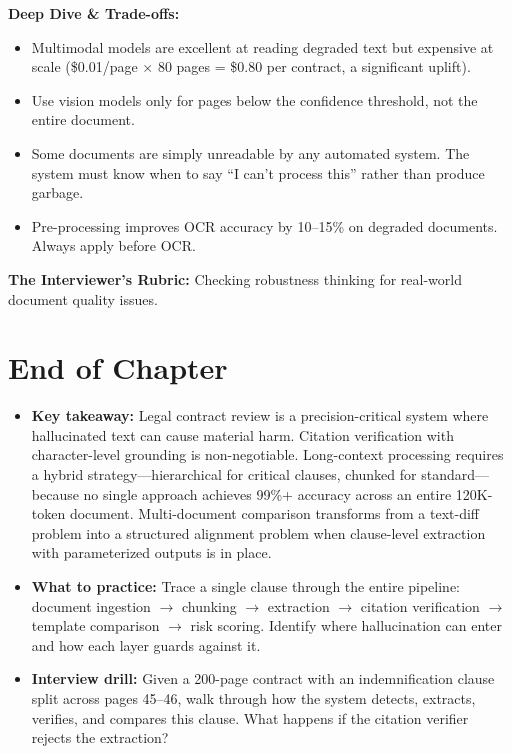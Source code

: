 \textbf{Deep Dive \& Trade-offs:}
\begin{itemize}
  \item Multimodal models are excellent at reading degraded text but expensive at scale (\$0.01/page $\times$ 80 pages = \$0.80 per contract, a significant uplift).
  \item Use vision models only for pages below the confidence threshold, not the entire document.
  \item Some documents are simply unreadable by any automated system. The system must know when to say ``I can't process this'' rather than produce garbage.
  \item Pre-processing improves OCR accuracy by 10--15\% on degraded documents. Always apply before OCR.
\end{itemize}

\textbf{The Interviewer's Rubric:} Checking robustness thinking for real-world document quality issues.

\section*{End of Chapter}

\begin{itemize}
  \item \textbf{Key takeaway:} Legal contract review is a precision-critical system where hallucinated text can cause material harm. Citation verification with character-level grounding is non-negotiable. Long-context processing requires a hybrid strategy---hierarchical for critical clauses, chunked for standard---because no single approach achieves 99\%+ accuracy across an entire 120K-token document. Multi-document comparison transforms from a text-diff problem into a structured alignment problem when clause-level extraction with parameterized outputs is in place.
  \item \textbf{What to practice:} Trace a single clause through the entire pipeline: document ingestion $\rightarrow$ chunking $\rightarrow$ extraction $\rightarrow$ citation verification $\rightarrow$ template comparison $\rightarrow$ risk scoring. Identify where hallucination can enter and how each layer guards against it.
  \item \textbf{Interview drill:} Given a 200-page contract with an indemnification clause split across pages 45--46, walk through how the system detects, extracts, verifies, and compares this clause. What happens if the citation verifier rejects the extraction?
\end{itemize}
